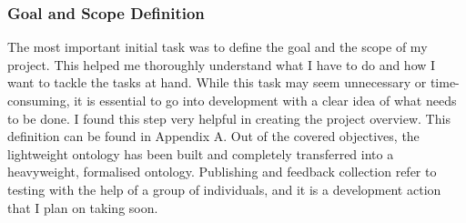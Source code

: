 \documentclass[titlepage]{article}
\begin{document}
\subsubsection{Goal and Scope Definition}
The most important initial task was to define the goal and the scope of my project. This helped me thoroughly understand what I have to do and how I want to tackle the tasks at hand.
\newline
While this task may seem unnecessary or time-consuming, it is essential to go into development with a clear idea of what needs to be done. I found this step very helpful in creating the project overview. This definition can be found in Appendix A.
\newline
Out of the covered objectives, the lightweight ontology has been built and completely transferred into a heavyweight, formalised ontology. Publishing and feedback collection refer to testing with the help of a group of individuals, and it is a development action that I plan on taking soon.

\end{document}

